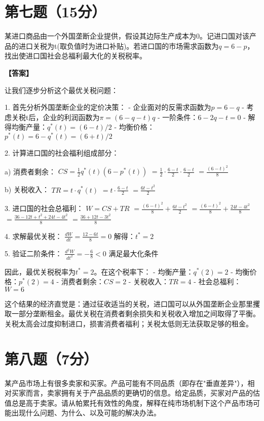\documentclass[12pt]{article}
\begin{document}
\section*{第七题（15分）}
某进口商品由一个外国垄断企业提供，假设其边际生产成本为0。记进口国对该产品的进口关税为t(取负值时为进口补贴)。若进口国的市场需求函数为$q=6-p$，找出使进口国社会总福利最大化的关税税率。

\noindent\textbf{【答案】}

让我们逐步分析这个最优关税问题：

1. 首先分析外国垄断企业的定价决策：
   - 企业面对的反需求函数为$p=6-q$
   - 考虑关税t后，企业的利润函数为$\pi=(6-q-t)q$
   - 一阶条件：$6-2q-t=0$
   - 解得均衡产量：$q^*(t)=(6-t)/2$
   - 均衡价格：$p^*(t)=6-q^*(t)=(6+t)/2$

2. 计算进口国的社会福利组成部分：

   a) 消费者剩余：
      $CS = \frac{1}{2}q^*(t)(6-p^*(t))$
      $= \frac{1}{2}\cdot\frac{6-t}{2}\cdot\frac{6-t}{2}$
      $= \frac{(6-t)^2}{8}$

   b) 关税收入：
      $TR = t\cdot q^*(t)$
      $= t\cdot\frac{6-t}{2}$
      $= \frac{6t-t^2}{2}$

3. 进口国的社会总福利：
   $W = CS + TR$
   $= \frac{(6-t)^2}{8} + \frac{6t-t^2}{2}$
   $= \frac{(6-t)^2}{8} + \frac{24t-4t^2}{8}$
   $= \frac{36-12t+t^2+24t-4t^2}{8}$
   $= \frac{36+12t-3t^2}{8}$

4. 求解最优关税：
   $\frac{dW}{dt} = \frac{12-6t}{8} = 0$
   解得：$t^* = 2$

5. 验证二阶条件：
   $\frac{d^2W}{dt^2} = -\frac{6}{8} < 0$
   满足最大化条件

因此，最优关税税率为$t^* = 2$。在这个税率下：
- 均衡产量：$q^*(2) = 2$
- 均衡价格：$p^*(2) = 4$
- 消费者剩余：$CS = 2$
- 关税收入：$TR = 4$
- 社会总福利：$W = 6$

这个结果的经济直觉是：通过征收适当的关税，进口国可以从外国垄断企业那里攫取一部分垄断租金。最优关税在消费者剩余损失和关税收入增加之间取得了平衡。关税太高会过度抑制进口，损害消费者福利；关税太低则无法获取足够的租金。

\section*{第八题（7分）}
某产品市场上有很多卖家和买家。产品可能有不同品质（即存在"垂直差异"），相对买家而言，卖家拥有关于产品品质的更确切的信息。给定品质，买家对产品的估值总是高于卖家。请从帕累托有效性的角度，解释在纯市场机制下这个产品市场可能出现什么问题、为什么、以及可能的解决办法。
\end{document}
